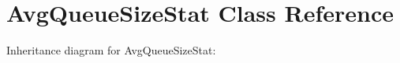 \hypertarget{classAvgQueueSizeStat}{}\section{Avg\+Queue\+Size\+Stat Class Reference}
\label{classAvgQueueSizeStat}


Inheritance diagram for Avg\+Queue\+Size\+Stat\+:
